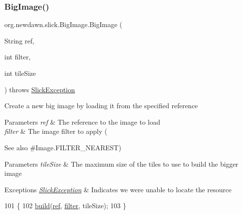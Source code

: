 \subsubsection{\texorpdfstring{Big\+Image()}{BigImage()}\hspace{0.1cm}{\footnotesize\ttfamily [4/6]}}
{\footnotesize\ttfamily org.\+newdawn.\+slick.\+Big\+Image.\+Big\+Image (\begin{DoxyParamCaption}\item[{String}]{ref,  }\item[{int}]{filter,  }\item[{int}]{tile\+Size }\end{DoxyParamCaption}) throws \mbox{\hyperlink{classorg_1_1newdawn_1_1slick_1_1_slick_exception}{Slick\+Exception}}\hspace{0.3cm}{\ttfamily [inline]}}

Create a new big image by loading it from the specified reference


\begin{DoxyParams}{Parameters}
{\em ref} & The reference to the image to load \\
\hline
{\em filter} & The image filter to apply (\\
\hline
\end{DoxyParams}
\begin{DoxySeeAlso}{See also}
\#\+Image.\+F\+I\+L\+T\+E\+R\+\_\+\+N\+E\+A\+R\+E\+ST) 
\end{DoxySeeAlso}

\begin{DoxyParams}{Parameters}
{\em tile\+Size} & The maximum size of the tiles to use to build the bigger image \\
\hline
\end{DoxyParams}

\begin{DoxyExceptions}{Exceptions}
{\em \mbox{\hyperlink{classorg_1_1newdawn_1_1slick_1_1_slick_exception}{Slick\+Exception}}} & Indicates we were unable to locate the resource \\
\hline
\end{DoxyExceptions}

\begin{DoxyCode}
101                                                                                 \{
102         \mbox{\hyperlink{classorg_1_1newdawn_1_1slick_1_1_big_image_a22a00890a41ddf7c996a84b2bc32621b}{build}}(\mbox{\hyperlink{classorg_1_1newdawn_1_1slick_1_1_image_a32694687591a80299d8b8ad1ea070cee}{ref}}, \mbox{\hyperlink{classorg_1_1newdawn_1_1slick_1_1_image_a1c6f09687817420f3762f32bb1c3ed76}{filter}}, tileSize);
103     \}
\end{DoxyCode}
\mbox{\label{classorg_1_1newdawn_1_1slick_1_1_big_image_a020e5bd78fd839b45afa304c2798a9a3}} 
